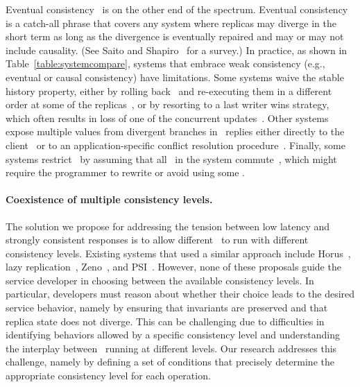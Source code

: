 Eventual consistency~\cite{Terry1995Managing} is on the other end of the
spectrum. Eventual consistency is a catch-all phrase that covers any
system where replicas may diverge in the short term as long as the
divergence is eventually repaired and may or may not include
causality.  (See Saito and Shapiro~\cite{Saito2005Optimistic} for a
survey.)  In practice, as shown in Table~\ref{table:systemcompare},
systems that embrace weak consistency (e.g., eventual or causal consistency) have limitations. Some
systems waive the stable history property, either by rolling back
\operations\ and re-executing them in a different order at some of the
replicas~\cite{Singh2009Zeno}, or by resorting to a last writer wins
strategy, which often results in loss of one of the
  concurrent updates~\cite{Lloyd2011Causal}.  Other systems expose multiple values from
divergent branches in \operations\ replies either directly to the
client~\cite{Mahajan2010Depot,Decandia2007Dynamo} or to an
application-specific conflict resolution
procedure~\cite{Terry1995Managing}.  Finally, some systems restrict
\operations\ by assuming that all \operations\ in the system
commute~\cite{Feldman2010Sporc,Shapiro2011Conflict}, which might require
the programmer to rewrite or avoid using some \operations.

\paragraph{Coexistence of multiple consistency levels.} The solution we propose for addressing the tension between low latency
and strongly consistent responses is to allow different
\operations\ to run with different consistency
levels. Existing systems that used a similar approach include
Horus~\cite{VanRenesse1996Horus}, lazy replication~\cite{Ladin1992LazyReplication}, Zeno~\cite{Singh2009Zeno}, and
PSI~\cite{Sovran2011PSI}. However, none of these proposals guide the
service developer in choosing between the available consistency
levels.  In particular, developers must reason about wheth\-er their
choice leads to the desired service behavior, namely by ensuring that
invariants are preserved and that replica state does not diverge.
This can be challenging due to difficulties in identifying behaviors
allowed by a specific consistency level and understanding the
interplay between \operations\ running at different levels.  Our
research addresses this challenge, namely by defining a set of
conditions that precisely determine the appropriate
  consistency level for each operation.

